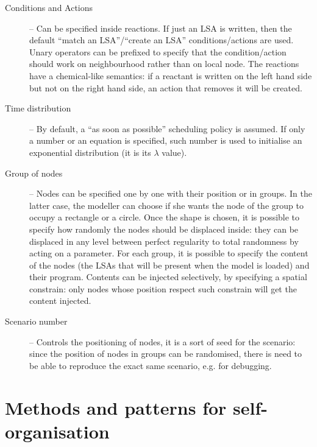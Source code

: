 \documentclass[12pt,a4paper,twoside,openright]{book}
\begin{document}
\begin{description}
 \item[Conditions and Actions] -- Can be specified inside reactions. If just an LSA is written, then the default ``match an LSA''/``create an LSA'' conditions/actions are used. Unary operators can be prefixed to specify that the condition/action should work on neighbourhood rather than on local node. The reactions have a chemical-like semantics: if a reactant is written on the left hand side but not on the right hand side, an action that removes it will be created.
 \item[Time distribution] -- By default, a ``as soon as possible'' scheduling policy is assumed. If only a number or an equation is specified, such number is used to initialise an exponential distribution (it is its $\lambda{}$ value).
 \item [Group of nodes] -- Nodes can be specified one by one with their position or in groups. In the latter case, the modeller can choose if she wants the node of the group to occupy a rectangle or a circle. Once the shape is chosen, it is possible to specify how randomly the nodes should be displaced inside: they can be displaced in any level between perfect regularity to total randomness by acting on a parameter. For each group, it is possible to specify the content of the nodes (the LSAs that will be present when the model is loaded) and their program. Contents can be injected selectively, by specifying a spatial constrain: only nodes whose position respect such constrain will get the content injected.
 \item[Scenario number] -- Controls the positioning of nodes, it is a sort of seed for the scenario: since the position of nodes in groups can be randomised, there is need to be able to reproduce the exact same scenario, e.g. for debugging. 
\end{description}

\part{Methods and patterns for self-organisation}
\label{contribution-pattern}
\end{document}
